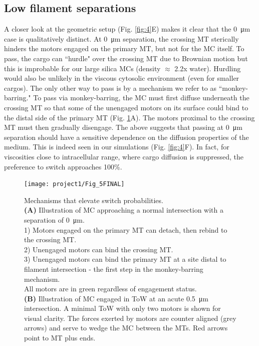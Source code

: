 \subsection{Low filament separations}

A closer look at the geometric setup (Fig. \ref{fig:4}E) makes it clear that the \SI{0}{\micro\meter} case is qualitatively distinct. At \SI{0}{\micro\meter} separation, the crossing MT sterically hinders the motors engaged on the primary MT, but not for the MC itself. To pass, the cargo can ``hurdle" over the crossing MT due to Brownian motion but this is improbable for our large silica MCs (density $\approx$ 2.2x water). Hurdling would also be unlikely in the viscous cytosolic environment (even for smaller cargos). The only other way to pass is by a mechanism we refer to as ``monkey-barring." To pass via monkey-barring, the MC must first diffuse underneath the crossing MT so that some of the unengaged motors on its surface could bind to the distal side of the primary MT (Fig. \ref{fig:5}A). The motors proximal to the crossing MT must then gradually disengage. The above suggests that passing at \SI{0}{\micro\meter} separation should have a sensitive dependence on the diffusion properties of the medium. This is indeed seen in our simulations (Fig. \ref{fig:4}F). In fact, for viscosities close to intracellular range, where cargo diffusion is suppressed, the preference to switch approaches 100\%.

\begin{figure}
\centering
\texttt{[image: project1/Fig\_5FINAL]}
\caption[Mechanisms that elevate switch probabilities]{Mechanisms that elevate switch probabilities.\\
\textbf{(A)} Illustration of MC approaching a normal intersection with a separation of \SI{0}{\micro\meter}. \\1) Motors engaged on the primary MT can detach, then rebind to the crossing MT. \\2) Unengaged motors can bind the crossing MT. \\3) Unengaged motors can bind the primary MT at a site distal to filament intersection - the first step in the monkey-barring mechanism. \\All motors are in green regardless of engagement status.\\
\textbf{(B)} Illustration of MC engaged in ToW at an acute \SI{.5}{\micro\meter} intersection. A minimal ToW with only two motors is shown for visual clarity. The forces exerted by motors are counter aligned (grey arrows) and serve to wedge the MC between the MTs. Red arrows point to MT plus ends.}
\label{fig:5}
\end{figure}

